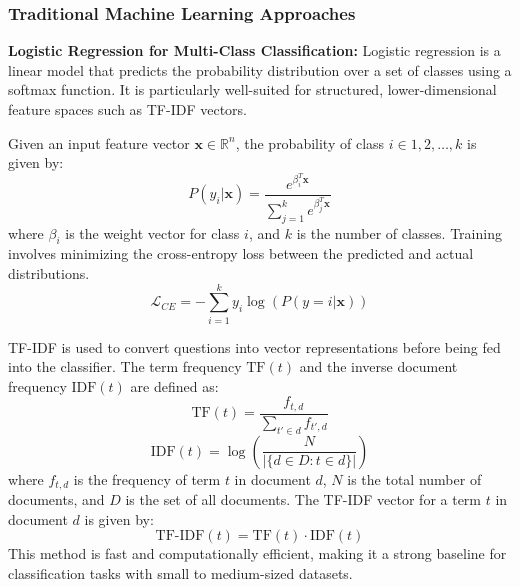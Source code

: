 \documentclass[conference]{IEEEtran}
\begin{document}
\subsubsection{Traditional Machine Learning Approaches}
\textbf{Logistic Regression for Multi-Class Classification:}
Logistic regression is a linear model that predicts the probability distribution over a set of classes using a softmax function. 
It is particularly well-suited for structured, lower-dimensional feature spaces such as TF-IDF vectors.

Given an input feature vector $\mathbf{x}\in \mathbb{R}^n$, the probability of class $i\in{1,2,\ldots,k}$ is given by:
\begin{equation}
    P(y_i | \mathbf{x}) = \frac{e^{\beta_i^T \mathbf{x}}}{\sum_{j=1}^{k} e^{\beta_j^T \mathbf{x}}}
\end{equation}
where $\beta_i$ is the weight vector for class $i$, and $k$ is the number of classes.
Training involves minimizing the cross-entropy loss between the predicted and actual distributions.
\begin{equation}
    \mathcal{L}_{CE} = -\sum_{i=1}^{k} y_i \log(P(y=i | \mathbf{x}))
\end{equation}

TF-IDF is used to convert questions into vector representations before being fed into the classifier.
The term frequency $\text{TF}(t)$  and the inverse document frequency $\text{IDF}(t)$ are defined as:
\begin{equation}
    \text{TF}(t) = \frac{f_{t,d}}{\sum_{t' \in d} f_{t',d}}
\end{equation}
\begin{equation}
    \text{IDF}(t) = \log\left(\frac{N}{|\{d \in D: t \in d\}|}\right)
\end{equation}
where $f_{t,d}$ is the frequency of term $t$ in document $d$, $N$ is the total number of documents, and $D$ is the set of all documents.
The TF-IDF vector for a term $t$ in document $d$ is given by:
\begin{equation}
    \text{TF-IDF}(t) = \text{TF}(t) \cdot \text{IDF}(t)
\end{equation}
This method is fast and computationally efficient, making it a strong baseline for classification tasks with small to medium-sized datasets.
\end{document}
